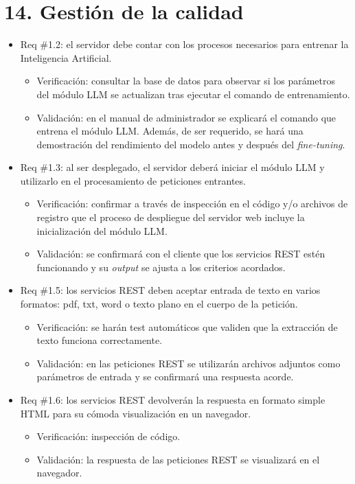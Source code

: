 \documentclass[
11pt, %
]{Clases/charter}
\begin{document}
\section{14. Gestión de la calidad}
\label{sec:calidad}

\begin{itemize}
	\item Req \#1.2: el servidor debe contar con los procesos necesarios para entrenar la Inteligencia Artificial.
	      \begin{itemize}
		      \item Verificación: consultar la base de datos para observar si los parámetros del módulo LLM se actualizan tras ejecutar el comando de entrenamiento.
		      \item Validación: en el manual de administrador se explicará el comando que entrena el módulo LLM.
		            Además, de ser requerido, se hará una demostración del rendimiento del modelo antes y después del \textit{fine-tuning}.
	      \end{itemize}

	\item Req \#1.3: al ser desplegado, el servidor deberá iniciar el módulo LLM y utilizarlo en el procesamiento de peticiones entrantes.
	      \begin{itemize}
		      \item Verificación: confirmar a través de inspección en el código y/o archivos de registro que el proceso de despliegue del servidor web incluye la inicialización del módulo LLM.
		      \item Validación: se confirmará con el cliente que los servicios REST estén funcionando y su \textit{output} se ajusta a los criterios acordados.
	      \end{itemize}

	\item Req \#1.5: los servicios REST deben aceptar entrada de texto en varios formatos: pdf, txt, word o texto plano en el cuerpo de la petición.
	      \begin{itemize}
		      \item Verificación: se harán test automáticos que validen que la extracción de texto funciona correctamente.
		      \item Validación: en las peticiones REST se utilizarán archivos adjuntos como parámetros de entrada y se confirmará una respuesta acorde.
	      \end{itemize}

	\item Req \#1.6: los servicios REST devolverán la respuesta en formato simple HTML para su cómoda visualización en un navegador.
	      \begin{itemize}
		      \item Verificación: inspección de código.
		      \item Validación: la respuesta de las peticiones REST se visualizará en el navegador.
	      \end{itemize}


\end{itemize}
\end{document}
